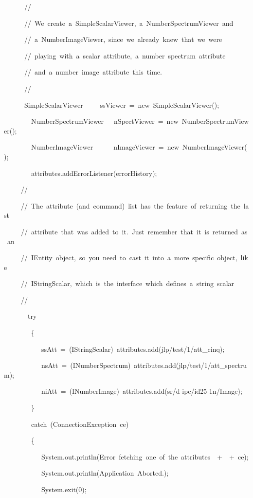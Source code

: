 \begin{lyxcode}
~~~~~~//

~~~~~~//~We~create~a~SimpleScalarViewer,~a~NumberSpectrumViewer~and

~~~~~~//~a~NumberImageViewer,~since~we~already~knew~that~we~were

~~~~~~//~playing~with~a~scalar~attribute,~a~number~spectrum~attribute

~~~~~~//~and~a~number~image~attribute~this~time.

~~~~~~//

~~~~~~SimpleScalarViewer~~~~~ssViewer~=~new~SimpleScalarViewer();

~~~~~~~~NumberSpectrumViewer~~~nSpectViewer~=~new~NumberSpectrumViewer();

~~~~~~~~NumberImageViewer~~~~~~nImageViewer~=~new~NumberImageViewer();

~~~~~~~~attributes.addErrorListener(errorHistory);

~~~~~//

~~~~~//~The~attribute~(and~command)~list~has~the~feature~of~returning~the~last

~~~~~//~attribute~that~was~added~to~it.~Just~remember~that~it~is~returned~as~an

~~~~~//~IEntity~object,~so~you~need~to~cast~it~into~a~more~specific~object,~like

~~~~~//~IStringScalar,~which~is~the~interface~which~defines~a~string~scalar

~~~~~//

~~~~~~~try

~~~~~~~~\{

~~~~~~~~~~~ssAtt~=~(IStringScalar)~attributes.add(\textquotedbl{}jlp/test/1/att\_cinq\textquotedbl{});

~~~~~~~~~~~nsAtt~=~(INumberSpectrum)~attributes.add(\textquotedbl{}jlp/test/1/att\_spectrum\textquotedbl{});

~~~~~~~~~~~niAtt~=~(INumberImage)~attributes.add(\textquotedbl{}sr/d-ipc/id25-1n/Image\textquotedbl{});

~~~~~~~~\}

~~~~~~~~catch~(ConnectionException~ce)

~~~~~~~~\{

~~~~~~~~~~~System.out.println(\textquotedbl{}Error~fetching~one~of~the~attributes~~\textquotedbl{}+\textquotedbl{}~\textquotedbl{}~+~ce);

~~~~~~~~~~~System.out.println(\textquotedbl{}Application~Aborted.\textquotedbl{});

~~~~~~~~~~~System.exit(0);


\end{lyxcode}
